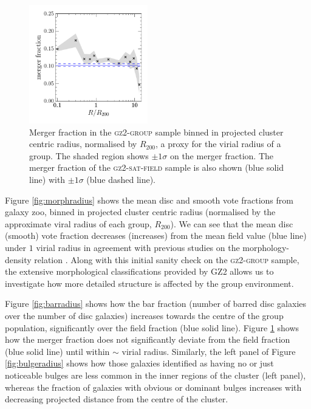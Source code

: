 \documentclass[useAMS,usenatbib]{mn2e}
\begin{document}
\begin{figure}
\includegraphics[width=0.46\textwidth]{merger_fraction_trend_with_log_radius_compare_sat_field_cand.pdf}
\caption{Merger fraction in the \textsc{gz2-group} sample binned in projected cluster centric radius, normalised by $R_{200}$, a proxy for the virial radius of a group. The shaded region shows $\pm1\sigma$ on the merger fraction. The merger fraction of the \textsc{gz2-sat-field} sample is also shown (blue solid line) with $\pm1\sigma$ (blue dashed line).}
\label{fig:mergerradius}
\end{figure}

Figure \ref{fig:morphradius} shows the mean disc and smooth vote fractions from galaxy zoo, binned in projected cluster centric radius (normalised by the approximate viral radius of each group, $R_{200}$). We can see that the mean disc (smooth) vote fraction decreases (increases) from the mean field value (blue line) under $1$ virial radius in agreement with previous studies on the morphology-density relation \citep{dressler80}. Along with this initial sanity check on the \textsc{gz2-group} sample, the extensive morphological classifications provided by GZ2 allows us to investigate how more detailed structure is affected by the group environment.  

Figure \ref{fig:barradius} shows how the bar fraction (number of barred disc galaxies over the number of disc galaxies) increases towards the centre of the group population, significantly over the field fraction (blue solid line). Figure \ref{fig:mergerradius} shows how the merger fraction does not significantly deviate from the field fraction (blue solid line) until within $\sim$ virial radius. Similarly, the left panel of Figure \ref{fig:bulgeradius} shows how those galaxies identified as having no or just noticeable bulges are less common in the inner regions of the cluster (left panel), whereas the fraction of galaxies with obvious or dominant bulges increases with decreasing projected distance from the centre of the cluster.
\end{document}
